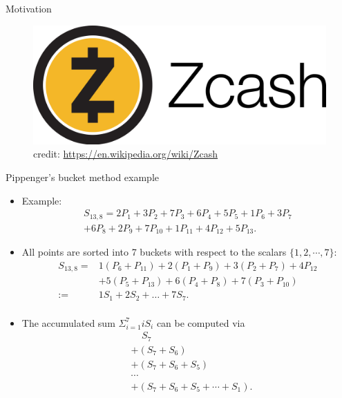 \documentclass[final]{beamer}
\newlength{\onecolwid}
\begin{document}
\begin{frame}[t]
\begin{columns}[t]
\begin{column}{\onecolwid}
\begin{block}{Motivation}

\begin{center}
		\begin{figure}
			\centering
			\includegraphics[width=0.4\linewidth]{Figures/Zcash_logo}
			\captionsetup{labelformat=empty}
			\caption{\centering \scriptsize credit: \url{https://en.wikipedia.org/wiki/Zcash}}
		\end{figure}
\end{center}					
\end{block}


\begin{block}{Pippenger's bucket method example}
\begin{small}
	\begin{itemize}	
		\item Example:
		\begin{eqnarray*}
		S_{13,8}=2 P_{1}+3 P_{2}+7 P_{3}+6 P_{4}+5 P_{5}+1 P_{6}+3 P_{7}\\
		+6 P_{8}+2 P_{9}+7 P_{10}+1 P_{11}+4 P_{12}+5 P_{13}.
		\end{eqnarray*}
		
		\item All points are sorted into 7 buckets with respect to the scalars $\{1, 2,\cdots, 7\}$:
		\begin{equation*}
		\begin{aligned}
		S_{13,8}=& 1 \left(P_{6}+P_{11}\right)+2\left(P_{1}+P_{9}\right)+3 \left(P_{2}+P_{7}\right)+4 P_{12} \\
		&+5\left(P_{5}+P_{13}\right)+6\left(P_{4}+P_{8}\right)+7 \left(P_{3}+P_{10}\right) \\
		:=& 1 S_{1}+2 S_{2}+\ldots+7 S_{7}.\\
		\end{aligned}
		\end{equation*}					
		\item {The accumulated sum $\Sigma_{i=1}^{7}iS_i$ can be computed via
		\begin{equation*}
		\begin{aligned}
		&\ \ \ \ \  S_7 \\
		&+ (S_7+S_6)\\
		&+ (S_7+S_6+S_5)\\
		&\cdots \\
		&+(S_7+S_6+S_5+\cdots +S_1).
		\end{aligned}
		\end{equation*}	}			
		

\end{itemize}
\end{small}
\end{block}
\end{column}
\end{columns}
\end{frame}
\end{document}
